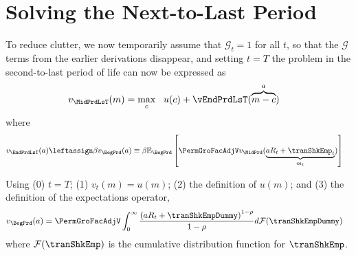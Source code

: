 \documentclass[titlepage, headings=optiontotocandhead]{econtex}
\begin{document}
\section{Solving the Next-to-Last Period}\label{sec:solving-the-next}

To reduce clutter, we now temporarily assume that $\mathcal{G}_{t}=1$ for all $t$, so that the $\mathcal{G}$ terms from the earlier derivations disappear, and setting $t=T$ the problem in the second-to-last period of life can now be expressed as
\begin{equation}\begin{gathered}\begin{aligned}
  v_{\MidPrdLsT}(m)  & = \max_{c} ~~ u(c) +
                              \vEndPrdLsT(\overbrace{m-c}^{a})
                              \label{eq:vEndTm1}
\end{aligned}\end{gathered}\end{equation}
where 
\begin{equation*}\begin{gathered}\begin{aligned}
  v_{\EndPrdLsT}(a)  & \leftassign \beta v_{\BegPrd}(a) 
                           \equiv \beta {\mathbb{E}}_{\BegPrd} \left[\PermGroFacAdjV v_{\MidPrd}(\underbrace{a R_{t} + \tranShkEmp_{t}}_{{m}_{t}})\right]
    \end{aligned}\end{gathered}\end{equation*}



Using (0) $t=T$; (1) $v_{t}(m)=u(m)$; (2) the definition of $u(m)$; and (3) the definition of the expectations operator,  %
\begin{equation}\begin{gathered}\begin{aligned}
      v_{\BegPrd}(a)   & = \PermGroFacAdjV\int_{0}^{\infty} \frac{\left(a R_{t}+ \tranShkEmpDummy\right)^{1-\rho}}{1-\rho}  d\mathcal{F}(\tranShkEmpDummy) \label{eq:NumDefInt}
    \end{aligned}\end{gathered}\end{equation}
where $\mathcal{F}(\tranShkEmp)$ is the cumulative distribution function for ${\tranShkEmp}$.
\end{document}
